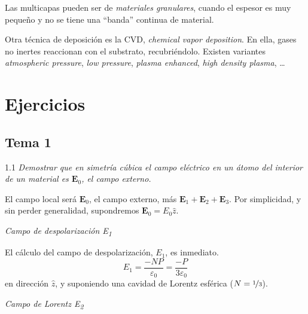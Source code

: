 \documentclass{tufte-book}
\begin{document}
Las multicapas pueden ser de \emph{materiales granulares}, cuando el
espesor es muy pequeño y no se tiene una ``banda'' continua de
material.

Otra técnica de deposición es la CVD, \emph{chemical vapor
  deposition}. En ella, gases no inertes reaccionan con el substrato,
recubriéndolo. Existen variantes \emph{atmospheric pressure},
\emph{low pressure}, \emph{plasma enhanced}, \emph{high density
  plasma}, \ldots



\part{Ejercicios}
\chapter*{Tema 1}
\begin{tcolorbox}[halign=left]
  \lettrine[lines=2]{\color{ExerciseNumberColor}1.1}{}
  \emph{ Demostrar que en simetría cúbica el campo eléctrico en un
    átomo del interior de un material es $\symbf{E}_0$, el campo externo.
  }
\end{tcolorbox}

El campo local será $\symbf{E}_0$, el campo externo, más
$\symbf{E}_1+\symbf{E}_2+\symbf{E}_3$. Por simplicidad, y sin
perder generalidad, supondremos $\symbf{E}_0 = E_0 \hat{z}$.

\begin{flushright}
  \emph{Campo de despolarización E\textsubscript{1}}
\end{flushright}

El cálculo del campo de despolarización, $E_1$, es inmediato.
\begin{equation}
  E_1 = \frac{-NP}{ε_0} = \frac{-P}{3ε_0}
\end{equation}
en dirección $\hat{z}$, y suponiendo una cavidad de Lorentz esférica
($N=\nicefrac{1}{3}$).


\begin{flushright}
  \emph{Campo de Lorentz E\textsubscript{2}}
\end{flushright}
\end{document}
